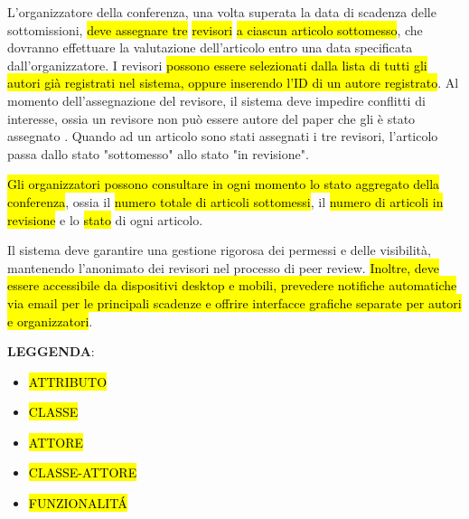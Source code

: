 L'organizzatore della conferenza, una volta superata la data di
scadenza delle sottomissioni, \hl{deve assegnare
  tre} \hl{revisori}
\hl{a ciascun articolo sottomesso}, che dovranno
effettuare la valutazione dell’articolo entro una data specificata
dall’organizzatore. I revisori \hl{possono
  essere selezionati dalla lista di tutti gli autori già registrati
  nel sistema, oppure inserendo l’ID di un autore registrato}. Al
momento dell'assegnazione del revisore, il sistema deve impedire
conflitti di interesse, ossia un revisore non può essere autore del
paper che gli è stato assegnato . Quando ad un articolo sono stati
assegnati i tre revisori, l’articolo passa dallo stato "sottomesso"
allo stato "in revisione".  \bigskip

\hl{Gli organizzatori possono consultare in ogni
  momento lo stato aggregato della conferenza}, ossia il
\hl{numero totale di articoli sottomessi}, il
\hl{numero di articoli in revisione} e lo
\hl{stato} di ogni articolo.  \bigskip

Il sistema deve garantire una gestione rigorosa dei permessi e delle
visibilità, mantenendo l'anonimato dei revisori nel processo di peer
review. \hl{Inoltre, deve essere accessibile da
  dispositivi desktop e mobili, prevedere notifiche automatiche via
  email per le principali scadenze e offrire interfacce grafiche
  separate per autori e organizzatori}.  \bigskip

\textbf{LEGGENDA}:
\begin{itemize}
\item {}\hl{ATTRIBUTO}
\item {}\hl{CLASSE}
\item {}\hl{ATTORE}
\item {}\hl{CLASSE-ATTORE}
\item {}\hl{FUNZIONALITÁ}
\end{itemize}
